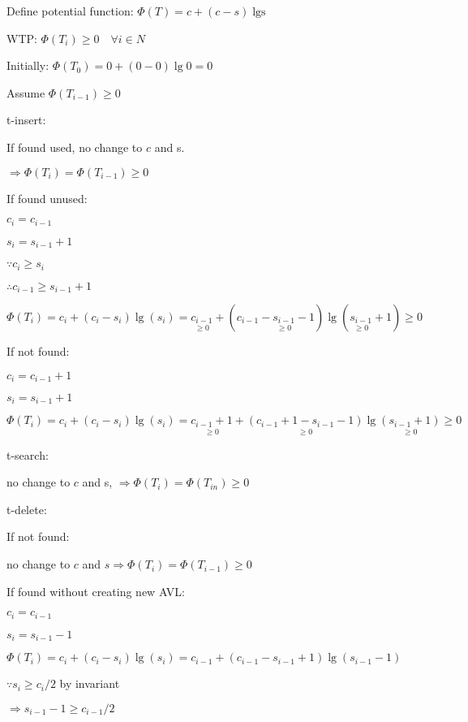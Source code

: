 \documentclass[12pt]{article}
\begin{document}
Define potential function: $\Phi(T)=c+(c-s) \operatorname{\lg s}$

WTP: $\Phi\left(T_i\right) \geqslant 0 \quad \forall i \in N$

Initially: $\Phi\left(T_0\right)=0+(0-0) \lg 0=0$

Assume $\Phi\left(T_{i-1}\right) \geqslant 0$

t-insert:

If found used, no change to $c$ and s.

$\Rightarrow \Phi\left(T_i\right)=\Phi\left(T_{i-1}\right) \geqslant 0$

If found unused:

$ c_i=c_{i-1} $

$ s_i=s_{i-1}+1 $

$ \because c_i \geqslant s_i $

$ \therefore c_{i-1} \geqslant s_{i-1}+1 $

$ \Phi\left(T_i\right)= c_i+\left(c_i-s_i\right)\lg (s_i)=\underset{\geqslant 0}{ c_{i-1}}+\left(c_{i-1}-\underset{\geqslant 0}{ s_{i-1}}-1\right)  
\lg\left(\underset{\geqslant 0}{ s_{i-1}}+1\right) \geqslant 0
$


If not found:

$c_i=c_{i-1}+1$

$s_i=s_{i-1}+1$

$\Phi\left(T_i\right)=c_i+\left(c_i-s_i\right)\lg (s_i)=\underset{\geqslant 0}{c_{i-1}+1}+\underset{\geqslant 0}{\left(c_{i-1}+1-s_{i-1}-1\right)}\lg\underset{\geqslant 0}{\left(s_{i-1}+1\right)} \geqslant 0$

t-search:

no change to $c$ and s, $\Rightarrow \Phi\left(T_i\right)=\Phi\left(T_{i n}\right) \geqslant 0$ 

t-delete:

If not found:

no change to $c$ and $s \Rightarrow \Phi\left(T_i\right)=\Phi\left(T_{i-1}\right) \geq 0$ 

If found without creating new AVL:

$ c_i=c_{i-1} $

$ s_i=s_{i-1}-1 $

$ \Phi\left(T_i\right)=c_i+\left(c_{i}-s_i\right) \lg \left(s_i\right)=c_{i-1}+\left(c_{i-1}-s_{i-1}+1\right)\lg\left(s_{i-1}-1\right) $

$ \because s_i \geqslant c_i / 2  $ by invariant

$ \Rightarrow s_{i-1}-1 \geqslant c_{i-1} / 2 $
\end{document}
